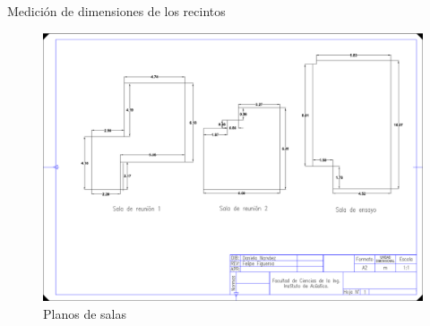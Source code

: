 \documentclass{sintefbeamer}
\begin{document}
\begin{frame}{Medición de dimensiones de los recintos}
\begin{figure}
    \centering
    \includegraphics[scale=0.2]{images/Planos/Planos.png}
    \caption{Planos de salas}
    \label{fig: planos}
\end{figure}
\end{frame}
\end{document}
